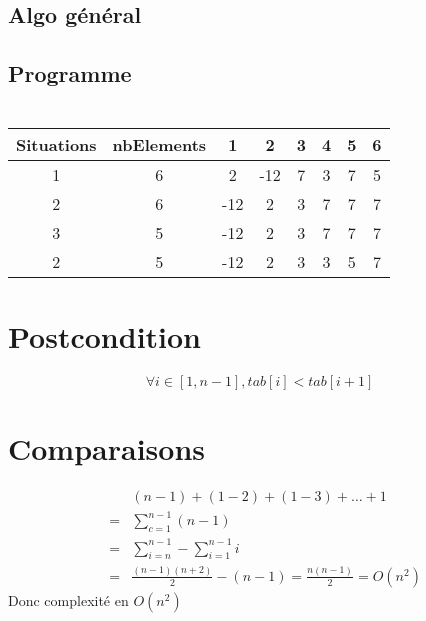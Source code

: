 \documentclass{article}
\begin{document}
	\subsection{}
			
	\section{}
			
			\newpage
	\section{}
		\subsection{Algo général}
			
		\subsection{Programme}	
			
		\section{}
			\begin{tabular}{|c|c|c|c|c|c|c|c|}
				\hline
					\textbf{Situations} &
					\textbf{nbElements} &
					\textbf{1} &
					\textbf{2} &
					\textbf{3} &
					\textbf{4} &
					\textbf{5} &
					\textbf{6}\\ 
				\hline
					1 & 6 & 2 &-12 & 7 & 3 & 7 & 5\\
				\hline
					2 & 6 & -12 &2 & 3 & 7 & 7 & 7\\
				\hline
					3 & 5 & -12 &2 & 3 & 7 & 7 & 7\\
				\hline
					2 & 5 & -12 &2 & 3 & 3 & 5 & 7\\
				\hline
			\end{tabular}
		\section{}	
		\section{Postcondition}	
			$$ \forall i \in [1,n-1], tab[i] < tab[i+1]$$ 
		\section{Comparaisons}
		\begin{eqnarray*}
			&&(n-1)+(1-2)+(1-3)+\dots+1\\
			&=&\sum^{n-1}_{c=1}{(n-1)} \\
			&=&\sum^{n-1}_{i=n}-\sum^{n-1}_{i=1}{i} \\
			&=& \frac{(n-1)(n+2)}{2} - (n-1) = 
			\frac{n(n-1)}{2}=O(n^{2})
		\end{eqnarray*} 
			Donc complexité en $O(n^{2})$
	
	
\end{document}
